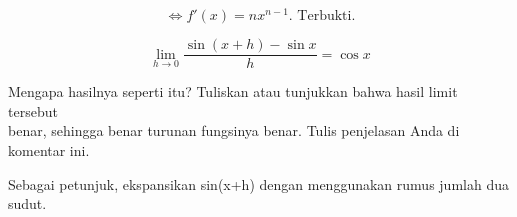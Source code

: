 \documentclass[a4paper,10pt]{article}
\begin{document}
\begin{eulernotebook}
\begin{eulercomment}
\begin{eulercomment}
\begin{eulercomment}
\begin{eulercomment}
\begin{eulercomment}
\begin{eulercomment}
\begin{eulercomment}
\begin{eulercomment}
\begin{eulerformula}
\[\]
\end{eulerformula}
\begin{eulercomment}
\end{eulercomment}
\begin{eulerformula}
\[
\text{$\Leftrightarrow f'(x)=nx^{n-1}$. Terbukti.}
\]
\end{eulerformula}
\begin{eulerformula}
\[
\lim_{h\rightarrow 0}{\frac{\sin \left(x+h\right)-\sin x}{h}}=\cos 
 x
\]
\end{eulerformula}
\begin{eulercomment}
Mengapa hasilnya seperti itu? Tuliskan atau tunjukkan bahwa hasil
limit tersebut\\
benar, sehingga benar turunan fungsinya benar.  Tulis penjelasan Anda
di komentar ini.

Sebagai petunjuk, ekspansikan sin(x+h) dengan menggunakan rumus jumlah
dua sudut.


\end{eulercomment}
\end{eulercomment}
\end{eulercomment}
\end{eulercomment}
\end{eulercomment}
\end{eulercomment}
\end{eulercomment}
\end{eulercomment}
\end{eulercomment}
\end{eulernotebook}
\end{document}
